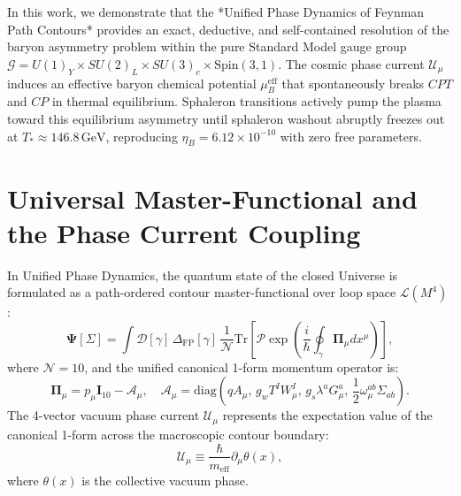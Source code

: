 \documentclass[11pt,a4paper]{article}
\begin{document}
In this work, we demonstrate that the *Unified Phase Dynamics of Feynman Path Contours* \cite{Pavliuk2026a,Pavliuk2026b} provides an exact, deductive, and self-contained resolution of the baryon asymmetry problem within the pure Standard Model gauge group $\mathcal{G} = U(1)_Y \times SU(2)_L \times SU(3)_c \times \text{Spin}(3,1)$. The cosmic phase current $\mathcal{U}_\mu$ induces an effective baryon chemical potential $\mu_B^{\mathrm{eff}}$ that spontaneously breaks $CPT$ and $CP$ in thermal equilibrium. Sphaleron transitions actively pump the plasma toward this equilibrium asymmetry until sphaleron washout abruptly freezes out at $T_* \approx 146.8\,\mathrm{GeV}$, reproducing $\eta_B = 6.12 \times 10^{-10}$ with zero free parameters.

\section{Universal Master-Functional and the Phase Current Coupling}

In Unified Phase Dynamics, the quantum state of the closed Universe is formulated as a path-ordered contour master-functional over loop space $\mathcal{L}(M^4)$ \cite{Pavliuk2026a}:
\begin{equation}
\mathbf{\Psi}[\Sigma] = \int \mathcal{D}[\gamma] \, \Delta_{\mathrm{FP}}[\gamma] \, \frac{1}{\mathcal{N}} \mathrm{Tr} \left[ \mathcal{P} \exp\left( \frac{i}{\hbar} \oint_\gamma \mathbf{\Pi}_\mu dx^\mu \right) \right],
\label{eq:master_functional}
\end{equation}
where $\mathcal{N} = 10$, and the unified canonical 1-form momentum operator is:
\begin{equation}
\mathbf{\Pi}_\mu = p_\mu \mathbf{I}_{10} - \mathbf{\mathcal{A}}_\mu, \quad \mathbf{\mathcal{A}}_\mu = \mathrm{diag}\left( q A_\mu, \, g_w T^I W_\mu^I, \, g_s \lambda^a G_\mu^a, \, \frac{1}{2}\omega_\mu^{ab}\Sigma_{ab} \right).
\end{equation}
The 4-vector vacuum phase current $\mathcal{U}_\mu$ represents the expectation value of the canonical 1-form across the macroscopic contour boundary:
\begin{equation}
\mathcal{U}_\mu \equiv \frac{\hbar}{m_{\mathrm{eff}}} \partial_\mu \theta(x),
\label{eq:phase_current}
\end{equation}
where $\theta(x)$ is the collective vacuum phase.
\end{document}
